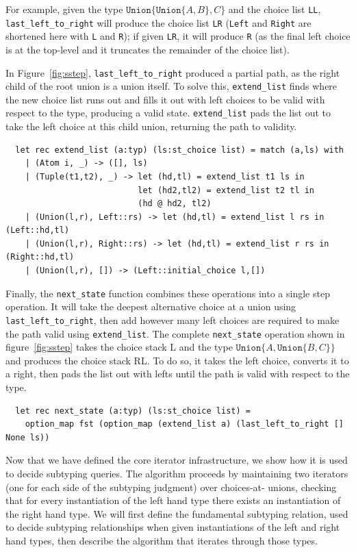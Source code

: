\documentclass[a4paper,english]{lipics-v2019}
\newcommand{\xt}[1]{\texttt{#1}}
\newcommand{\union}[2]{\xt{Union\{}#1,#2\xt{\}}}
\begin{document}
For example, given the
type $\union{\union{A}{B}}{C}$ and the choice list \verb+LL+,
\verb|last_left_to_right| will produce the choice list \verb+LR+
(\verb+Left+ and \verb+Right+ are shortened here with \verb+L+ and
\verb+R+); if given \verb+LR+, it will produce \verb+R+ (as the final
left choice is at the top-level and it truncates the remainder of the
choice list).

In Figure~\ref{fig:sstep},
\verb|last_left_to_right| produced a partial path, as the right child of the root
union is a union itself. To solve this, \verb|extend_list| finds where the new
choice list runs out and fills it out with left choices to be valid with respect to the type,
producing a valid state. \verb|extend_list| pads the list out to take the left choice
at this child union, returning the path to validity.
\begin{small}
\begin{verbatim}
  let rec extend_list (a:typ) (ls:st_choice list) = match (a,ls) with
    | (Atom i, _) -> ([], ls)
    | (Tuple(t1,t2), _) -> let (hd,tl) = extend_list t1 ls in
                           let (hd2,tl2) = extend_list t2 tl in
                           (hd @ hd2, tl2)
    | (Union(l,r), Left::rs) -> let (hd,tl) = extend_list l rs in (Left::hd,tl)
    | (Union(l,r), Right::rs) -> let (hd,tl) = extend_list r rs in (Right::hd,tl)
    | (Union(l,r), []) -> (Left::initial_choice l,[])
\end{verbatim}
\end{small}


Finally, the \verb|next_state| function combines these operations into
a single step operation. It will take the deepest alternative choice
at a union using \verb|last_left_to_right|, then add however many left
choices are required to make the path valid using \verb|extend_list|. The
complete \verb|next_state| operation shown in figure~\ref{fig:sstep} takes
the choice stack L and the type $\union{A}{\union{B}{C}}$ and produces the
choice stack RL. To do so, it takes the left choice, converts it to a right,
then pads the list out with lefts until the path is valid with respect to the 
type.
\begin{small}
\begin{verbatim}
  let rec next_state (a:typ) (ls:st_choice list) =
    option_map fst (option_map (extend_list a) (last_left_to_right [] None ls))
\end{verbatim}
\end{small}


Now that we have defined the core iterator infrastructure, we show how it
is used to decide subtyping queries. The algorithm proceeds by maintaining two
iterators (one for each side of the subtyping judgment) over choices-at-
unions,  checking that for every instantiation of the left hand type there
exists an instantiation of the right hand type. We will first define the
fundamental subtyping relation, used to decide subtyping relationships when
given instantiations of the left and right hand types, then describe the
algorithm that iterates through those types.
\end{document}
